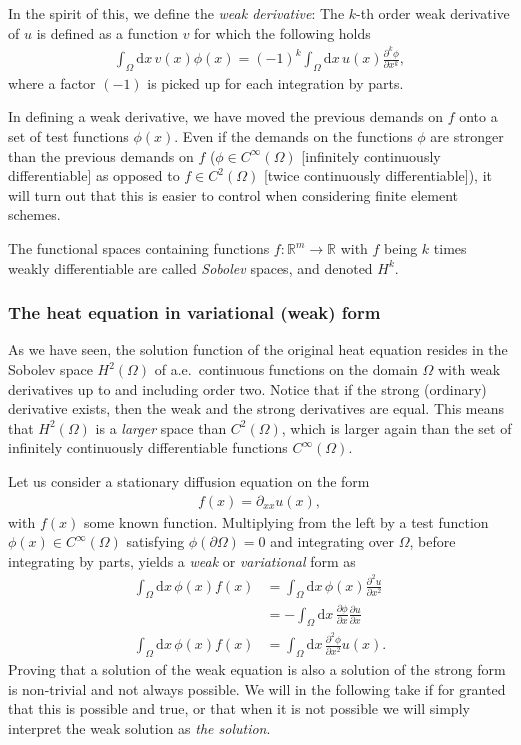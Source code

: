 \documentclass[a4paper, twocolumn]{article}
\begin{document}
In the spirit of this, we define the \textit{weak derivative}: The $k$-th order weak derivative of $u$ is defined as a function $v$ for which the following holds
\begin{align}
\int_\Omega \mathrm{d}x\, v(x)\phi(x) = (-1)^k \int_\Omega\mathrm{d}x\, u(x)\frac{\partial^k \phi}{\partial x^k},
\end{align}
where a factor $(-1)$ is picked up for each integration by parts. 

In defining a weak derivative, we have moved the previous demands on $f$ onto a set of test functions $\phi(x)$. Even if the demands on the functions $\phi$ are stronger than the previous demands on $f$ ($\phi\in C^\infty(\Omega)$ [infinitely continuously differentiable] as opposed to $f\in C^2(\Omega)$ [twice continuously differentiable]), it will turn out that this is easier to control when considering finite element schemes. 

The functional spaces containing functions $f:\mathds{R}^m\rightarrow\mathds{R}$ with $f$ being $k$ times weakly differentiable are called \textit{Sobolev} spaces, and denoted $H^k$. 

\subsubsection{The heat equation in variational (weak) form}
As we have seen, the solution function of the original heat equation resides in the Sobolev space $H^2(\Omega)$ of a.e.\ continuous functions on the domain $\Omega$ with weak derivatives up to and including order two. Notice that if the strong (ordinary) derivative exists, then the weak and the strong derivatives are equal. This means that $H^2(\Omega)$ is a \textit{larger} space than $C^2(\Omega)$, which is larger again than the set of infinitely continuously differentiable functions $C^\infty(\Omega)$.

Let us consider a stationary diffusion equation on the form
\begin{align}
f(x)=\partial_{xx}u(x),
\end{align} 
with $f(x)$ some known function. Multiplying from the left by a test function $\phi(x)\in C^\infty(\Omega)$ satisfying $\phi(\partial\Omega)=0$ and integrating over $\Omega$, before integrating by parts, yields a \textit{weak} or \textit{variational} form as
\begin{align}
\int_\Omega\mathrm{d}x\, \phi(x)f(x) &= \int_\Omega \mathrm{d}x\, \phi(x)\frac{\partial^2 u}{\partial x^2} \nonumber \\
%
&= -\int_\Omega \mathrm{d}x\, \frac{\partial \phi}{\partial x}\frac{\partial u}{\partial x} \label{eq:weak1} \\
%
\int_\Omega\mathrm{d}x\, \phi(x)f(x) &=  \int_\Omega \mathrm{d}x\, \frac{\partial^2 \phi}{\partial x^2}u(x). \label{eq:weak2}
\end{align}
Proving that a solution of the weak equation is also a solution of the strong form is non-trivial and not always possible. We will in the following take if for granted that this is possible and true, or that when it is not possible we will simply interpret the weak solution as \textit{the solution}. 
\end{document}
